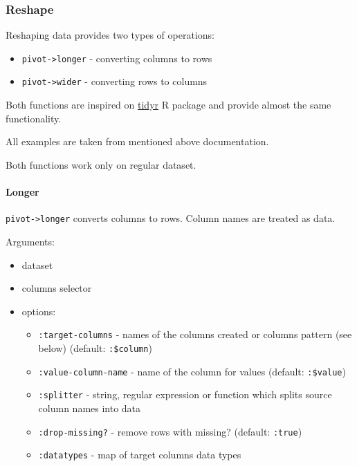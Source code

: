 \documentclass[]{article}
\providecommand{\tightlist}{%
  \setlength{\itemsep}{0pt}\setlength{\parskip}{0pt}}
\let\oldparagraph\paragraph
\renewcommand{\paragraph}[1]{\oldparagraph{#1}\mbox{}}
\begin{document}
\hypertarget{reshape}{%
\subsubsection{Reshape}\label{reshape}}

Reshaping data provides two types of operations:

\begin{itemize}
\tightlist
\item
  \texttt{pivot-\textgreater{}longer} - converting columns to rows
\item
  \texttt{pivot-\textgreater{}wider} - converting rows to columns
\end{itemize}

Both functions are inspired on
\href{https://tidyr.tidyverse.org/articles/pivot.html}{tidyr} R package
and provide almost the same functionality.

All examples are taken from mentioned above documentation.

Both functions work only on regular dataset.

\hypertarget{longer}{%
\paragraph{Longer}\label{longer}}

\texttt{pivot-\textgreater{}longer} converts columns to rows. Column
names are treated as data.

Arguments:

\begin{itemize}
\tightlist
\item
  dataset
\item
  columns selector
\item
  options:

  \begin{itemize}
  \tightlist
  \item
    \texttt{:target-columns} - names of the columns created or columns
    pattern (see below) (default: \texttt{:\$column})
  \item
    \texttt{:value-column-name} - name of the column for values
    (default: \texttt{:\$value})
  \item
    \texttt{:splitter} - string, regular expression or function which
    splits source column names into data
  \item
    \texttt{:drop-missing?} - remove rows with missing? (default:
    \texttt{:true})
  \item
    \texttt{:datatypes} - map of target columns data types
  \end{itemize}
\end{itemize}
\end{document}
